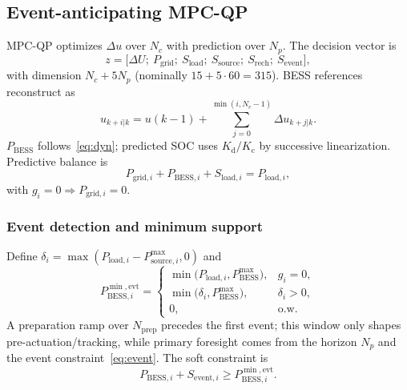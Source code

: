 \documentclass{ieeeaccess}
\begin{document}
\subsection{Event-anticipating MPC-QP}
\label{sec:mpc}
MPC-QP optimizes $\Delta u$ over $N_c$ with prediction over $N_p$. The decision vector is
\begin{equation}
z=\big[\Delta U;\ P_{\mathrm{grid}};\ S_{\mathrm{load}};\ S_{\mathrm{source}};\ S_{\mathrm{rech}};\ S_{\mathrm{event}}\big],
\end{equation}
with dimension $N_c+5N_p$ (nominally $15+5\cdot 60=315$). BESS references reconstruct as
\begin{equation}
u_{k+i|k}=u(k-1)+\sum_{j=0}^{\min(i,N_c-1)}\Delta u_{k+j|k}.
\end{equation}
$P_{\mathrm{BESS}}$ follows~\eqref{eq:dyn}; predicted SOC uses $K_{\mathrm{d}}/K_{\mathrm{c}}$ by successive linearization. Predictive balance is
\begin{equation}
P_{\mathrm{grid},i}+P_{\mathrm{BESS},i}+S_{\mathrm{load},i}=P_{\mathrm{load},i},
\end{equation}
with $g_i=0\Rightarrow P_{\mathrm{grid},i}=0$.

\subsubsection{Event detection and minimum support}
Define $\delta_i=\max(P_{\mathrm{load},i}-P_{\mathrm{source},i}^{\max},0)$ and
\begin{equation}
\label{eq:support}
P_{\mathrm{BESS},i}^{\min,\mathrm{evt}}=
\begin{cases}
\min\!\big(P_{\mathrm{load},i},P_{\mathrm{BESS}}^{\max}\big), & g_i=0,\\[2pt]
\min\!\big(\delta_i,P_{\mathrm{BESS}}^{\max}\big), & \delta_i>0,\\[2pt]
0, & \text{o.w.}
\end{cases}
\end{equation}
A preparation ramp over $N_{\mathrm{prep}}$ precedes the first event; this window only shapes pre-actuation/tracking, while primary foresight comes from the horizon $N_p$ and the event constraint~\eqref{eq:event}. The soft constraint is
\begin{equation}
\label{eq:event}
P_{\mathrm{BESS},i}+S_{\mathrm{event},i}\ge P_{\mathrm{BESS},i}^{\min,\mathrm{evt}}.
\end{equation}
\end{document}
